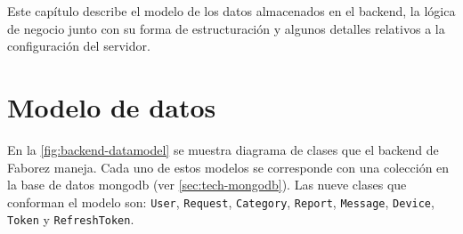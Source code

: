 \documentclass[main]{subfiles}
\begin{document}
Este capítulo describe el modelo de los datos almacenados en el \gls{backend}, la lógica de negocio junto con su forma de estructuración y algunos detalles relativos a la configuración del servidor.

\section{Modelo de datos}

En la \cref{fig:backend-datamodel} se muestra diagrama de clases que el \gls{backend} de Faborez maneja. Cada uno de estos modelos se corresponde con una colección en la base de datos \gls{mongodb} (ver \cref{sec:tech-mongodb}). Las nueve clases que conforman el modelo son: \texttt{User}, \texttt{Request}, \texttt{Category}, \texttt{Report}, \texttt{Message}, \texttt{Device}, \texttt{Token} y \texttt{RefreshToken}.
\end{document}
